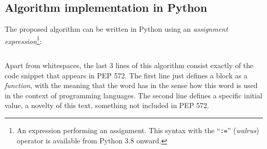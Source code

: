 \subsection*{Algorithm implementation in Python}

The proposed algorithm can be written in Python
using an \emph{assignment expression}\footnote{
  An expression performing an assignment.
  This syntax with the ``\texttt{:=}'' (\emph{walrus}) operator
  is available from Python 3.8 onward.
}:

\begin{center}
  \begin{minipage}{7cm}
    \inputminted{python}{nth_root.py}
  \end{minipage}
\end{center}

Apart from whitespaces,
the last $3$ lines of this algorithm
consist exactly of the code snippet that appears in PEP 572.
The first line just defines a block as a \emph{function},
with the meaning that the word has
in the sense how this word is used
in the context of programming languages.
The second line defines a specific initial value,
a novelty of this text, something not included in PEP 572.
